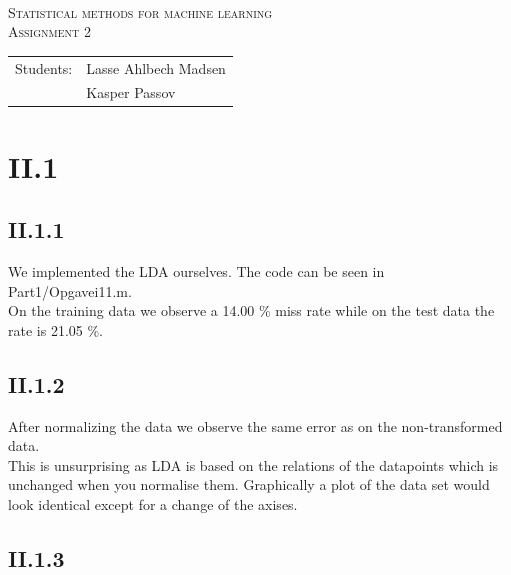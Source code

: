 \documentclass{article}
\begin{document}
\begin{titlepage}
\begin{center}
    \hline \\[0.2cm]
\textsc{\Large Statistical methods for machine learning}\\[0.5cm]
\textsc{\large Assignment 2}\\[0.5cm]
    \hline
    \hline
\vspace{2 cm}
\begin{tabular}{ll}
Students: & Lasse Ahlbech Madsen \\
          & Kasper Passov\\
\end{tabular}
\end{center}
\vspace{5 cm}
\newpage
\end{titlepage}

\section{II.1}

\subsection{II.1.1}

We implemented the LDA ourselves. The code can be seen in
Part1/Opgavei11.m. \\
On the training data we observe a 14.00 \% miss rate while on the test data
the rate is 21.05 \%.

\subsection{II.1.2}

After normalizing the data we observe the same error as on the
non-transformed data. \\ 

This is unsurprising as LDA is based on the relations of the datapoints
which is unchanged when you normalise them. Graphically a plot of the data
set would look identical except for a change of the axises.

\subsection{II.1.3}
\end{document}

